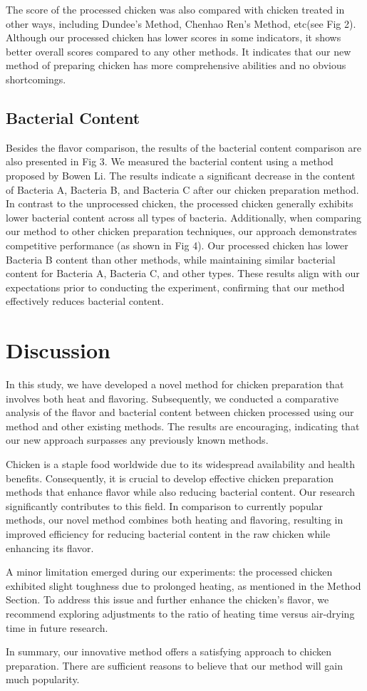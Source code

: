 \documentclass[a4paper,12pt]{article}
\begin{document}
    The score of the processed chicken was also compared with chicken treated in other ways, including Dundee's Method\cite{dundee}, Chenhao Ren's Method\cite{rch}, etc(see Fig 2). Although our processed chicken has lower scores in some indicators, it shows better overall scores compared to any other methods. It indicates that our new method of preparing chicken has more comprehensive abilities and no obvious shortcomings.
    \subsection*{Bacterial Content}
    Besides the flavor comparison, the results of the bacterial content comparison are also presented in Fig 3. We measured the bacterial content using a method proposed by Bowen Li\cite{lbw}. The results indicate a significant decrease in the content of Bacteria A, Bacteria B, and Bacteria C after our chicken preparation method. In contrast to the unprocessed chicken, the processed chicken generally exhibits lower bacterial content across all types of bacteria. Additionally, when comparing our method to other chicken preparation techniques, our approach demonstrates competitive performance (as shown in Fig 4). Our processed chicken has lower Bacteria B content than other methods, while maintaining similar bacterial content for Bacteria A, Bacteria C, and other types. These results align with our expectations prior to conducting the experiment, confirming that our method effectively reduces bacterial content.

    \section{Discussion}
    In this study, we have developed a novel method for chicken preparation that involves both heat and flavoring. Subsequently, we conducted a comparative analysis of the flavor and bacterial content between chicken processed using our method and other existing methods. The results are encouraging, indicating that our new approach surpasses any previously known methods.

    Chicken is a staple food worldwide due to its widespread availability and health benefits. Consequently, it is crucial to develop effective chicken preparation methods that enhance flavor while also reducing bacterial content. Our research significantly contributes to this field. In comparison to currently popular methods\cite{rch}\cite{dundee}\cite{fjh}\cite{zy}, our novel method combines both heating and flavoring, resulting in improved efficiency for reducing bacterial content in the raw chicken while enhancing its flavor.

    A minor limitation emerged during our experiments: the processed chicken exhibited slight toughness due to prolonged heating, as mentioned in the Method Section. To address this issue and further enhance the chicken’s flavor, we recommend exploring adjustments to the ratio of heating time versus air-drying time in future research.

    In summary, our innovative method offers a satisfying approach to chicken preparation. There are sufficient reasons to believe that our method will gain much popularity.
	
	
\end{document}
